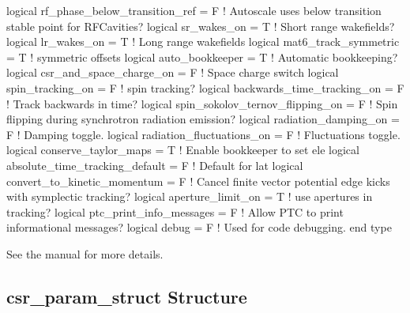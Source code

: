 {{{{{{{{\begin{example}
    logical rf_phase_below_transition_ref = F   ! Autoscale uses below transition stable point for RFCavities?
    logical sr_wakes_on = T                     ! Short range wakefields?
    logical lr_wakes_on = T                     ! Long range wakefields
    logical mat6_track_symmetric = T            ! symmetric offsets
    logical auto_bookkeeper = T                 ! Automatic bookkeeping?
    logical csr_and_space_charge_on = F         ! Space charge switch
    logical spin_tracking_on = F                ! spin tracking?
    logical backwards_time_tracking_on = F      ! Track backwards in time?
    logical spin_sokolov_ternov_flipping_on = F ! Spin flipping during synchrotron radiation emission?
    logical radiation_damping_on = F            ! Damping toggle.
    logical radiation_fluctuations_on = F       ! Fluctuations toggle.
    logical conserve_taylor_maps = T            ! Enable bookkeeper to set ele%
    logical absolute_time_tracking_default = F  ! Default for lat%
    logical convert_to_kinetic_momentum = F     ! Cancel finite vector potential edge kicks with symplectic tracking?
    logical aperture_limit_on = T               ! use apertures in tracking?
    logical ptc_print_info_messages = F         ! Allow PTC to print informational messages?
    logical debug = F                           ! Used for code debugging.
  end type
\end{example}
See the \bmad manual for more details.

\subsection{csr\_param\_struct Structure}
\label{s:csr.param.struct} 

}}}}}}}}
